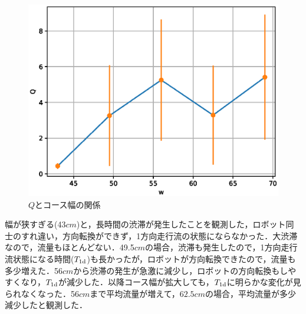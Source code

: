 \begin{figure}[!ht]
    \centering
    \includegraphics[width=1.0\linewidth]{diagram4.eps}
    \caption{$Q$とコース幅の関係}
    \label{dia2}
\end{figure}

幅が狭すぎる(43$cm$)と，長時間の渋滞が発生したことを観測した，ロボット同士のすれ違い，方向転換ができず，1方向走行流の状態にならなかった．大渋滞なので，流量もほとんどない．49.5$cm$の場合，渋滞も発生したので，1方向走行流状態になる時間($T_{\rm 1d}$)も長かったが，ロボットが方向転換できたので，流量も多少増えた．56$cm$から渋滞の発生が急激に減少し，ロボットの方向転換もしやすくなり，$T_{\rm 1d}$が減少した．以降コース幅が拡大しても，$T_{\rm 1d}$に明らかな変化が見られなくなった．56$cm$まで平均流量が増えて，$62.5cm$の場合，平均流量が多少減少したと観測した．

